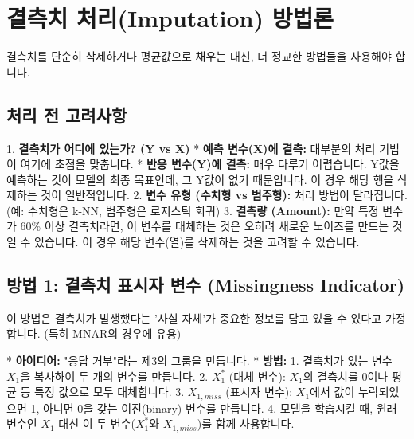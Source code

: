 \documentclass[11pt,a4paper]{book}
\theoremstyle{definition}
\begin{document}
\section{결측치 처리(Imputation) 방법론}

결측치를 단순히 삭제하거나 평균값으로 채우는 대신, 더 정교한 방법들을 사용해야 합니다.

\subsection{처리 전 고려사항}

1.  \textbf{결측치가 어디에 있는가? (Y vs X)}
    * \textbf{예측 변수(X)에 결측:} 대부분의 처리 기법이 여기에 초점을 맞춥니다.
    * \textbf{반응 변수(Y)에 결측:} 매우 다루기 어렵습니다. Y값을 예측하는 것이 모델의 최종 목표인데, 그 Y값이 없기 때문입니다. 이 경우 해당 행을 삭제하는 것이 일반적입니다.
2.  \textbf{변수 유형 (수치형 vs 범주형):} 처리 방법이 달라집니다. (예: 수치형은 k-NN, 범주형은 로지스틱 회귀)
3.  \textbf{결측량 (Amount):} 만약 특정 변수가 60\% 이상 결측치라면, 이 변수를 대체하는 것은 오히려 새로운 노이즈를 만드는 것일 수 있습니다. 이 경우 해당 변수(열)를 삭제하는 것을 고려할 수 있습니다.

\subsection{방법 1: 결측치 표시자 변수 (Missingness Indicator)}

이 방법은 결측치가 발생했다는 '사실 자체'가 중요한 정보를 담고 있을 수 있다고 가정합니다. (특히 MNAR의 경우에 유용)

* \textbf{아이디어:} "응답 거부"라는 제3의 그룹을 만듭니다.
* \textbf{방법:}
    1.  결측치가 있는 변수 \(X_1\)을 복사하여 두 개의 변수를 만듭니다.
    2.  \(X_1^*\) (대체 변수): \(X_1\)의 결측치를 0이나 평균 등 특정 값으로 모두 대체합니다.
    3.  \(X_{1,miss}\) (표시자 변수): \(X_1\)에서 값이 누락되었으면 1, 아니면 0을 갖는 이진(binary) 변수를 만듭니다.
    4.  모델을 학습시킬 때, 원래 변수인 \(X_1\) 대신 이 두 변수(\(X_1^*\)와 \(X_{1,miss}\))를 함께 사용합니다.
\end{document}
